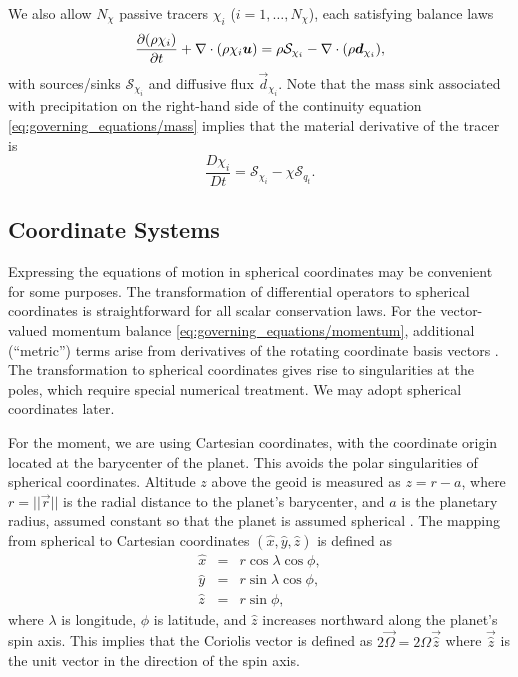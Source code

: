 \documentclass{article}
\begin{document}
We also allow $N_\chi$ passive tracers $\chi_i$ ($i=1, \dots, N_\chi$), each satisfying balance laws
\begin{equation}
\frac{\partial (\rho \chi_i)}{\partial t} + \nabla \cdot \left(\rho \chi_i \boldsymbol{{u}} \right) = \rho \mathcal{S}_{\chi_i} - \nabla \cdot (\rho \boldsymbol{{d}}_{\chi_i}),   
\label{eq:tracers}
\end{equation}
with sources/sinks $\mathcal{S}_{\chi_i}$ and diffusive flux $\vec{d}_{\chi_i}$. Note that the mass sink associated with precipitation on the right-hand side of the continuity equation \eqref{eq:governing_equations/mass} implies that the material derivative of the tracer is 
\[
\frac{D\chi_i}{Dt} = \mathcal{S}_{\chi_i} - \chi \mathcal{S}_{q_t}.
\]
 
\subsection{Coordinate Systems}

Expressing the equations of motion in spherical coordinates may be convenient for some purposes. The transformation of differential operators to spherical coordinates is straightforward for all scalar conservation laws. For the vector-valued momentum balance \eqref{eq:governing_equations/momentum}, additional (``metric'') terms arise from derivatives of the rotating coordinate basis vectors \citep[e.g.,][]{Staniforth03a}. The transformation to spherical coordinates gives rise to singularities at the poles, which require special numerical treatment.  We may adopt spherical coordinates later. 

For the moment, we are using Cartesian coordinates, with the coordinate origin located at the barycenter of the planet. This avoids the polar singularities of spherical coordinates. Altitude $z$ above the geoid is measured as $z=r-a$, where $r=||\vec{r}||$ is the radial distance to the planet's barycenter, and $a$ is the planetary radius, assumed constant so that the planet is assumed spherical \citep[see][]{giraldo:2001,giraldo:2002,giraldo:2013}. The mapping from spherical to Cartesian coordinates $(\hat x, \hat y, \hat z)$ is defined as
\begin{eqnarray*}
\hat x &=& r \cos \lambda \cos \phi,\\
\hat y &=& r \sin \lambda \cos \phi, \\
\hat z &=& r \sin \phi,
\end{eqnarray*}
where $\lambda$ is longitude, $\phi$ is latitude, and $\hat z$ increases northward along the planet's spin axis. This implies that the Coriolis vector is defined as $2 \vec{\Omega} = 2 \Omega \vec{\hat z}$ where $\vec{\hat z}$ is the unit vector in the direction of the spin axis. 
\end{document}

